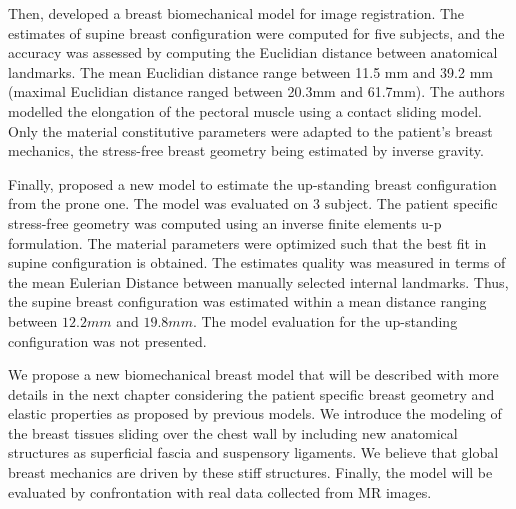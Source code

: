 Then, \cite{han_nonlinear_2014} developed a breast biomechanical model for image registration. The estimates of supine breast configuration were computed for five subjects, and the accuracy was assessed by computing the Euclidian distance between anatomical landmarks.  The mean Euclidian distance range between 11.5 mm and 39.2 mm (maximal Euclidian distance ranged between 20.3mm and 61.7mm). The authors modelled the elongation of the pectoral muscle using a contact sliding model. Only the material constitutive parameters were adapted to the patient’s breast mechanics, the stress-free breast geometry being estimated by inverse gravity. 

Finally, \cite{eiben_surface_2016} proposed a new model to estimate the up-standing breast configuration from the prone one. The model was evaluated on 3 subject. The patient specific stress-free geometry was computed using an inverse finite elements u-p formulation. The material parameters were optimized such that the best fit in supine configuration is obtained. The estimates quality was measured in terms of the mean Eulerian Distance between manually selected internal landmarks. Thus, the supine breast configuration was estimated within a mean distance ranging between $12.2mm$ and $19.8 mm$. The model evaluation for the up-standing configuration was not presented.

We propose a new biomechanical breast model that will be described with more details in the next chapter considering the patient specific breast geometry and elastic properties as proposed by previous models. We introduce the modeling of the breast tissues sliding over the chest wall by including new anatomical structures as superficial fascia and suspensory ligaments. We believe that global breast mechanics are driven by these stiff structures. Finally, the model will be evaluated by confrontation with real data collected from MR images.        
 
 

